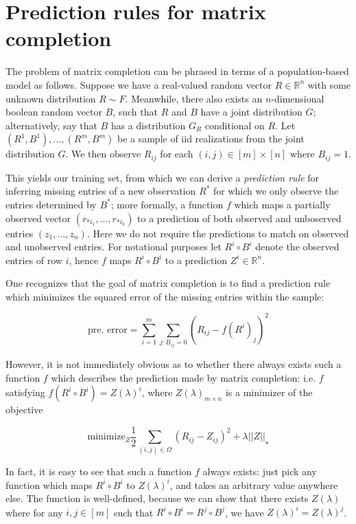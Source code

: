 \documentclass[11pt]{article}
\begin{document}
\section{Prediction rules for matrix completion}

The problem of matrix completion can be phrased in terms of a
population-based model as follows.  Suppose we have a real-valued
random vector $R \in \mathbb{R}^n$ with some unknown distribution $R
\sim F$.  Meanwhile, there also exists an $n$-dimensional boolean
random vector $B$, such that $R$ and $B$ have a joint distribution
$G$; alternatively, say that $B$ has a distribution $G_R$ conditional
on $R$.  Let $(R^1, B^1), ... , (R^m, B^m)$ be a sample of iid
realizations from the joint distribution $G$.  We then observe
$R_{ij}$ for each $(i, j) \in [m] \times [n]$ where $B_{ij} = 1$.

This yields our training set, from which we can derive a \emph{prediction
rule} for inferring missing entries of a new observation $R^*$ for
which we only observe the entries determined by $B^*$; more formally,
a function $f$ which maps a partially observed vector $(r_{* i_1},...,
r_{* i_k})$ to a prediction of both observed and unboserved entries
$(z_1, ..., z_n)$.  Here we do not require the predictions to match on
observed and unobserved entries.  For notational purposes let $R^i
\circ B^i$ denote the observed entries of row $i$, hence $f$ maps $R^i
\circ B^i$ to a prediction $Z^i \in \mathbb{R}^n$.

One recognizes that the goal of matrix completion is to find a
prediction rule which minimizes the squared error of the missing
entries within the sample:

$$
\text{pre. error} = \sum_{i = 1}^m \sum_{j: B_{ij} = 0} (R_{ij} - f(R^i)_{j})^2
$$

However, it is not immediately obvious as to whether there always
exists such a function $f$ which describes the prediction made by
matrix completion: i.e. $f$ satisfying $f(R^i \circ B^i) =
Z(\lambda)^i$, where $Z(\lambda)_{m \times n}$ is a minimizer of the
objective

$$
\text{minimize}_Z \frac{1}{2}\sum_{(i,j) \in \Omega} (R_{ij} - Z_{ij})^2 + \lambda ||Z||_\star 
$$

In fact, it is easy to see that such a function $f$ always exists:
just pick any function which maps $R^i \circ B^i$ to $Z(\lambda)^i$,
and takes an arbitrary value anywhere else.  The function is
well-defined, because we can show that there exists $Z(\lambda)$ where
for any $i, j \in [m]$ such that $R^i\circ B^i = R^j \circ B^j$, we
have $Z(\lambda)^i = Z(\lambda)^j$.
\end{document}
